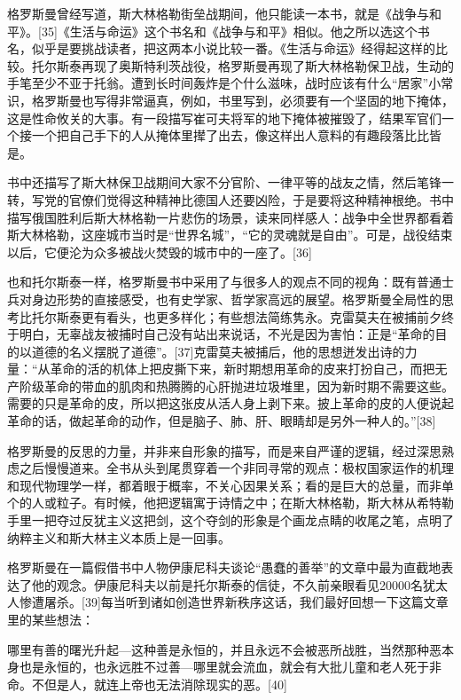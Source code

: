 格罗斯曼曾经写道，斯大林格勒街垒战期间，他只能读一本书，就是《战争与和平》。[35]《生活与命运》这个书名和《战争与和平》相似。他之所以选这个书名，似乎是要挑战读者，把这两本小说比较一番。《生活与命运》经得起这样的比较。托尔斯泰再现了奥斯特利茨战役，格罗斯曼再现了斯大林格勒保卫战，生动的手笔至少不亚于托翁。遭到长时间轰炸是个什么滋味，战时应该有什么“居家”小常识，格罗斯曼也写得非常逼真，例如，书里写到，必须要有一个坚固的地下掩体，这是性命攸关的大事。有一段描写崔可夫将军的地下掩体被摧毁了，结果军官们一个接一个把自己手下的人从掩体里撵了出去，像这样出人意料的有趣段落比比皆是。

书中还描写了斯大林保卫战期间大家不分官阶、一律平等的战友之情，然后笔锋一转，写党的官僚们觉得这种精神比德国人还要凶险，于是要将这种精神根绝。书中描写俄国胜利后斯大林格勒一片悲伤的场景，读来同样感人：战争中全世界都看着斯大林格勒，这座城市当时是“世界名城”，“它的灵魂就是自由”。可是，战役结束以后，它便沦为众多被战火焚毁的城市中的一座了。[36]

也和托尔斯泰一样，格罗斯曼书中采用了与很多人的观点不同的视角：既有普通士兵对身边形势的直接感受，也有史学家、哲学家高远的展望。格罗斯曼全局性的思考比托尔斯泰更有看头，也更多样化；有些想法简练隽永。克雷莫夫在被捕前夕终于明白，无辜战友被捕时自己没有站出来说话，不光是因为害怕：正是“革命的目的以道德的名义摆脱了道德”。[37]克雷莫夫被捕后，他的思想迸发出诗的力量：“从革命的活的机体上把皮撕下来，新时期想用革命的皮来打扮自己，而把无产阶级革命的带血的肌肉和热腾腾的心肝抛进垃圾堆里，因为新时期不需要这些。需要的只是革命的皮，所以把这张皮从活人身上剥下来。披上革命的皮的人便说起革命的话，做起革命的动作，但是脑子、肺、肝、眼睛却是另外一种人的。”[38]

格罗斯曼的反思的力量，并非来自形象的描写，而是来自严谨的逻辑，经过深思熟虑之后慢慢道来。全书从头到尾贯穿着一个非同寻常的观点：极权国家运作的机理和现代物理学一样，都着眼于概率，不关心因果关系；看的是巨大的总量，而非单个的人或粒子。有时候，他把逻辑寓于诗情之中；在斯大林格勒，斯大林从希特勒手里一把夺过反犹主义这把剑，这个夺剑的形象是个画龙点睛的收尾之笔，点明了纳粹主义和斯大林主义本质上是一回事。

格罗斯曼在一篇假借书中人物伊康尼科夫谈论“愚蠢的善举”的文章中最为直截地表达了他的观念。伊康尼科夫以前是托尔斯泰的信徒，不久前亲眼看见20000名犹太人惨遭屠杀。[39]每当听到诸如创造世界新秩序这话，我们最好回想一下这篇文章里的某些想法：

哪里有善的曙光升起—这种善是永恒的，并且永远不会被恶所战胜，当然那种恶本身也是永恒的，也永远胜不过善—哪里就会流血，就会有大批儿童和老人死于非命。不但是人，就连上帝也无法消除现实的恶。[40]

